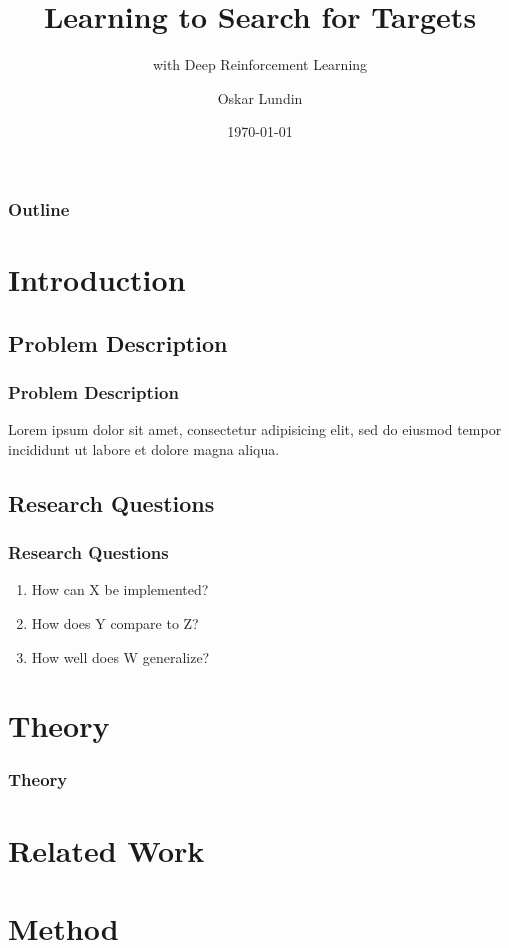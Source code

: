 \documentclass{beamer}
\title{Learning to Search for Targets}
\subtitle{with Deep Reinforcement Learning}
\author{Oskar Lundin}
\institute{Linköping University}
\date{\today}
\begin{document}
\begin{frame}
    \titlepage
\end{frame}

\begin{frame}
    \frametitle{Outline}
    \tableofcontents
\end{frame}

\section{Introduction}

\subsection{Problem Description}

\begin{frame}
    \frametitle{Problem Description}
    Lorem ipsum dolor sit amet, consectetur adipisicing elit, sed do eiusmod tempor incididunt ut labore et dolore magna aliqua.
\end{frame}

\subsection{Research Questions}

\begin{frame}
    \frametitle{Research Questions}
    \begin{enumerate}
        \item How can X be implemented?
        \item How does Y compare to Z?
        \item How well does W generalize?
    \end{enumerate}    
\end{frame}

\section{Theory}

\begin{frame}
    \frametitle{Theory}
    \section{Related Work}
\end{frame}

\section{Method}
\end{document}
